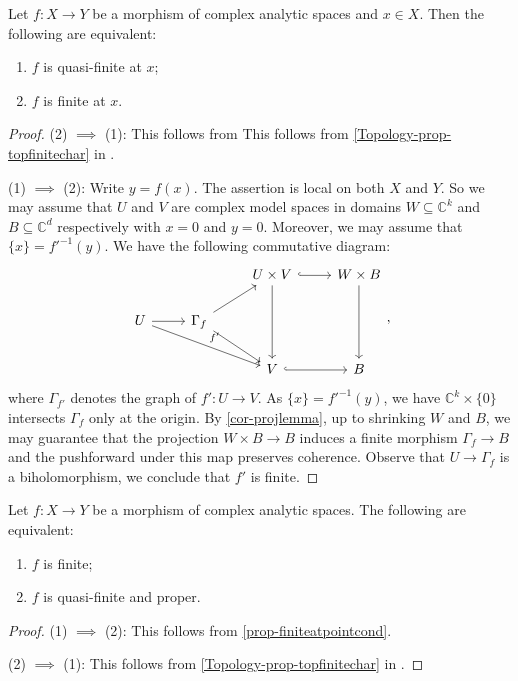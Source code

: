 \begin{proposition}\label{prop-finiteatpointcond}
    Let $f:X\rightarrow Y$ be a morphism of complex analytic spaces and $x\in X$. Then the following are equivalent:
    \begin{enumerate}
        \item $f$ is quasi-finite at $x$;
        \item $f$ is finite at $x$.
    \end{enumerate}
\end{proposition}
\begin{proof}
    (2) $\implies$ (1): This follows from This follows from \cref{Topology-prop-topfinitechar} in .

    (1) $\implies$ (2): Write $y=f(x)$.  The assertion is local on both $X$ and $Y$. So we may assume that $U$ and $V$ are complex model spaces in domains $W\subseteq \mathbb{C}^k$ and $B\subseteq \mathbb{C}^d$ respectively with $x=0$ and $y=0$. Moreover, we may assume that $\{x\}=f'^{-1}(y)$. We have the following commutative diagram:
    \[
        \begin{tikzcd}
            &                                & U\times V \arrow[dd] \arrow[r, hook] & W\times B \arrow[dd] \\
U \arrow[r] \arrow[rrd,"f'"] & \Gamma_f \arrow[rd] \arrow[ru] &                                      &                      \\
            &                                & V \arrow[r, hook]                    & B                   
\end{tikzcd},
    \]
    where $\Gamma_{f'}$ denotes the graph of $f':U\rightarrow V$. As $\{x\}=f'^{-1}(y)$, we have $\mathbb{C}^k\times\{0\}$ intersects $\Gamma_f$ only at the origin. By \cref{cor-projlemma}, up to shrinking $W$ and $B$, we may guarantee that the projection $W\times B\rightarrow B$ induces a finite morphism $\Gamma_f\rightarrow B$ and the pushforward under this map preserves coherence. Observe that $U\rightarrow \Gamma_f$ is a biholomorphism, we conclude that $f'$ is finite. 
\end{proof}

\begin{corollary}
    Let $f:X\rightarrow Y$ be a morphism of complex analytic spaces. The following are equivalent:
    \begin{enumerate}
        \item $f$ is finite;
        \item $f$ is quasi-finite and proper.
    \end{enumerate}
\end{corollary}
\begin{proof}
    (1) $\implies$ (2): This follows from \cref{prop-finiteatpointcond}.

    (2) $\implies$ (1): This follows from \cref{Topology-prop-topfinitechar} in .
\end{proof}

